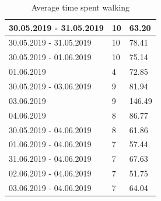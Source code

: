 \begin{table}[]
{\begin{tabular}{|l|l|l|}
			30.05.2019 - 31.05.2019    & 10         & 63.20                    \\ \hline
			30.05.2019 - 31.05.2019    & 10         & 78.41                    \\ \hline
			30.05.2019 - 01.06.2019    & 10         & 75.14                    \\ \hline
			01.06.2019                 & 4          & 72.85                    \\ \hline
			30.05.2019 - 03.06.2019    & 9          & 81.94                    \\ \hline
			03.06.2019                 & 9          & 146.49                   \\ \hline
			04.06.2019                 & 8          & 86.77                    \\ \hline
			30.05.2019 - 04.06.2019    & 8          & 61.86                    \\ \hline
			01.06.2019 - 04.06.2019    & 7          & 57.44                    \\ \hline
			31.06.2019 - 04.06.2019    & 7          & 67.63                    \\ \hline
			02.06.2019 - 04.06.2019    & 7          & 51.75                    \\ \hline
			03.06.2019 - 04.06.2019    & 7          & 64.04                    \\ \hline
		\end{tabular}
		\label{results-walking}
		\caption{Average time spent walking}
	}
\end{table}

